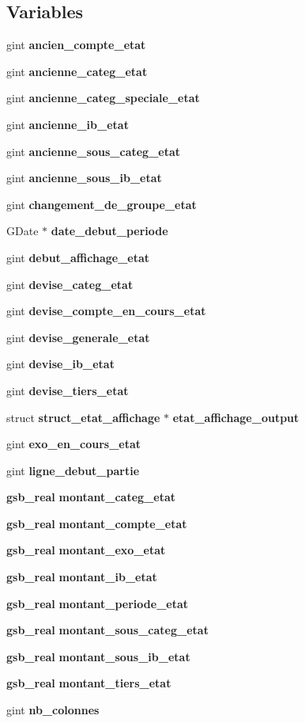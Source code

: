 \subsection*{Variables}
\begin{DoxyCompactItemize}
\item 
gint {\bf ancien\_\-compte\_\-etat}
\item 
gint {\bf ancienne\_\-categ\_\-etat}
\item 
gint {\bf ancienne\_\-categ\_\-speciale\_\-etat}
\item 
gint {\bf ancienne\_\-ib\_\-etat}
\item 
gint {\bf ancienne\_\-sous\_\-categ\_\-etat}
\item 
gint {\bf ancienne\_\-sous\_\-ib\_\-etat}
\item 
gint {\bf changement\_\-de\_\-groupe\_\-etat}
\item 
GDate $\ast$ {\bf date\_\-debut\_\-periode}
\item 
gint {\bf debut\_\-affichage\_\-etat}
\item 
gint {\bf devise\_\-categ\_\-etat}
\item 
gint {\bf devise\_\-compte\_\-en\_\-cours\_\-etat}
\item 
gint {\bf devise\_\-generale\_\-etat}
\item 
gint {\bf devise\_\-ib\_\-etat}
\item 
gint {\bf devise\_\-tiers\_\-etat}
\item 
struct {\bf struct\_\-etat\_\-affichage} $\ast$ {\bf etat\_\-affichage\_\-output}
\item 
gint {\bf exo\_\-en\_\-cours\_\-etat}
\item 
gint {\bf ligne\_\-debut\_\-partie}
\item 
{\bf gsb\_\-real} {\bf montant\_\-categ\_\-etat}
\item 
{\bf gsb\_\-real} {\bf montant\_\-compte\_\-etat}
\item 
{\bf gsb\_\-real} {\bf montant\_\-exo\_\-etat}
\item 
{\bf gsb\_\-real} {\bf montant\_\-ib\_\-etat}
\item 
{\bf gsb\_\-real} {\bf montant\_\-periode\_\-etat}
\item 
{\bf gsb\_\-real} {\bf montant\_\-sous\_\-categ\_\-etat}
\item 
{\bf gsb\_\-real} {\bf montant\_\-sous\_\-ib\_\-etat}
\item 
{\bf gsb\_\-real} {\bf montant\_\-tiers\_\-etat}
\item 
gint {\bf nb\_\-colonnes}

\end{DoxyCompactItemize}
